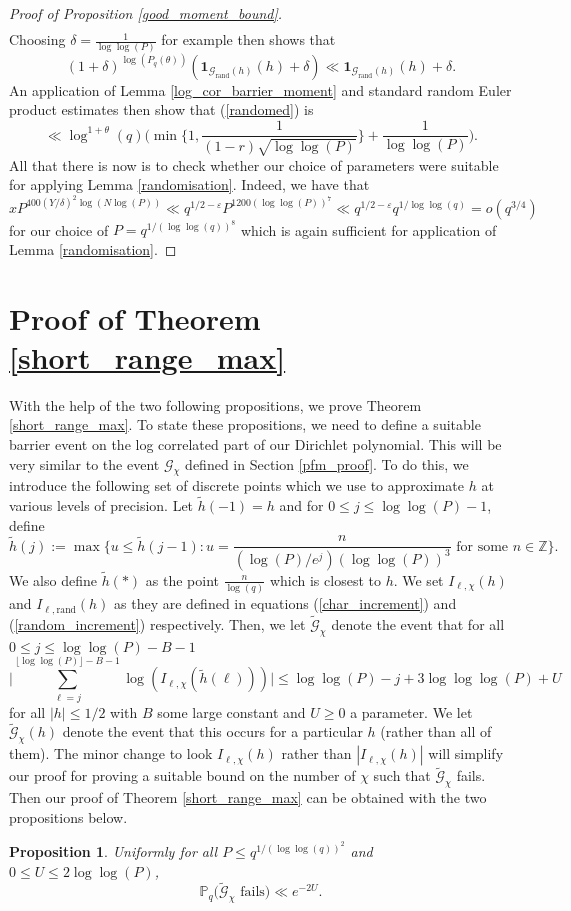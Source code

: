 \documentclass[10pt,a4paper]{amsart}
\newtheorem{proposition}{Proposition}[section]
\numberwithin{equation}{section}
\begin{document}
\begin{proof}[Proof of Proposition \ref{good_moment_bound}]
\begin{align*}
\end{align*}
Choosing $\delta = \frac{1}{\log\log(P)}$ for example then shows that
$$(1+\delta)^{\log(P_q(\theta))}(\mathbf{1}_{\mathcal{G}_{\text{rand}}(h)}(h)+\delta) \ll \mathbf{1}_{\mathcal{G}_{\text{rand}}(h)}(h)+\delta.$$
An application of Lemma \ref{log_cor_barrier_moment} and standard random Euler product estimates then show that (\ref{randomed}) is
$$\ll \log^{1+\theta}(q)\big(\min\big\{1,\frac{1}{(1-r)\sqrt{\log\log(P)}}\big\}+\frac{1}{\log\log(P)}\big).$$
All that there is now is to check whether our choice of parameters were suitable for applying Lemma \ref{randomisation}. Indeed, we have that $$xP^{400(Y/\delta)^2\log(N\log(P))} \ll q^{1/2-\varepsilon}P^{1200(\log\log(P))^7} \ll q^{1/2-\varepsilon}q^{1/\log\log(q)} = o(q^{3/4})$$ for our choice of $P = q^{1/(\log\log(q))^8}$ which is again sufficient for application of Lemma \ref{randomisation}.
\end{proof}
\section{Proof of Theorem \ref{short_range_max}} \label{typical_max_section}
With the help of the two following propositions, we prove Theorem \ref{short_range_max}. To state these propositions, we need to define a suitable barrier event on the log correlated part of our Dirichlet polynomial. This will be very similar to the event $\mathcal{G}_\chi$ defined in Section \ref{pfm_proof}. To do this, we introduce the following set of discrete points which we use to approximate $h$ at various levels of precision. Let $\tilde{h}(-1) =h$ and for $0 \leq j \leq \log\log(P)-1$, define
$$\tilde{h}(j) := \max\big\{u \leq \tilde{h}(j-1):u=\frac{n}{(\log(P)/e^j)(\log\log(P))^3} \text{ for some } n \in \mathbb{Z}\big\}.$$
We also define $\tilde{h}(*)$ as the point $\frac{n}{\log(q)}$ which is closest to $h$. We set $I_{\ell,\chi}(h)$ and $I_{\ell,\text{rand}}(h)$ as they are defined in equations (\ref{char_increment}) and (\ref{random_increment}) respectively. Then, we let $\widetilde{\mathcal{G}}_\chi$ denote the event that for all $0 \leq j \leq \log\log(P)-B-1$
$$\big|\sum_{\ell =j}^{\lfloor\log\log(P)\rfloor-B-1}\log(I_{\ell,\chi}(\tilde{h}(\ell)))\big| \leq \log\log(P)-j+3\log\log\log(P) +U$$
for all $|h| \leq 1/2$ with $B$ some large constant and $U\geq 0$ a parameter. We let $\widetilde{\mathcal{G}}_\chi(h)$ denote the event that this occurs for a particular $h$ (rather than all of them). The minor change to look $I_{\ell,\chi}(h)$ rather than $|I_{\ell,\chi}(h)|$ will simplify our proof for proving a suitable bound on the number of $\chi$ such that $\widetilde{\mathcal{G}}_\chi$ fails. Then our proof of Theorem \ref{short_range_max} can be obtained with the two propositions below.
\begin{proposition}
    Uniformly for all $P \leq q^{1/(\log\log(q))^2}$ and $0 \leq U \leq 2\log\log(P)$,
    $$\mathbb{P}_q\big(\widetilde{\mathcal{G}}_\chi \text{ fails}\big) \ll e^{-2U}.$$ \label{max_event_fail}
\end{proposition}
\end{document}
